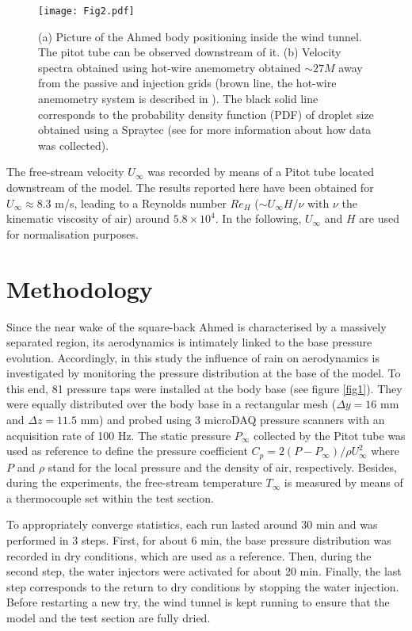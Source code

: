 \documentclass[doublecol]{epl2}
\begin{document}
\begin{figure}
\centering
\texttt{[image: Fig2.pdf]}
\caption{(a) Picture of the Ahmed body positioning inside the wind tunnel. The pitot tube can be observed downstream of it. (b) Velocity spectra obtained using hot-wire anemometry obtained $\sim27M$ away from the passive and injection grids (brown line, the hot-wire anemometry system is described in \cite{ferran2022experimental}). The black solid line corresponds to the probability density function (PDF) of droplet size obtained using a Spraytec (see \cite{sumbekova2017preferential} for more information about how data was collected).}  
\label{fig2}
\end{figure}
 
 The free-stream velocity $U_\infty$ was recorded by means of a Pitot tube located downstream of the model. The results reported here have been obtained for $U_\infty \approx 8.3$ m/s, leading to a Reynolds number $Re_H$ ($\sim U_\infty H/\nu$ with $\nu$ the kinematic viscosity of air) around $5.8 \times 10^4$. In the following, $U_\infty$ and $H$ are used for normalisation purposes.
 
\section{Methodology}

Since the near wake of the square-back Ahmed is characterised by a massively separated region, its aerodynamics is intimately linked to the base pressure evolution. Accordingly, in this study the influence of rain on aerodynamics is investigated by monitoring the pressure distribution at the base of the model. To this end, 81 pressure taps were installed at the body base (see figure \ref{fig1}). They were equally distributed over the body base  in a rectangular mesh ($\Delta y = 16$ mm and $\Delta z = 11.5$ mm) and probed using 3 microDAQ pressure scanners with an acquisition rate of 100 Hz. The static pressure $P_\infty$ collected by the Pitot tube was used as reference to define the pressure coefficient $C_p = 2\left(P-P_\infty\right)/\rho U_\infty^2$ where $P$ and $\rho$ stand for the local pressure and the density of air, respectively. Besides, during the experiments, the free-stream temperature $T_\infty$ is measured by means of a thermocouple set within the test section.

To appropriately converge statistics, each run lasted around 30 min and was performed in 3 steps. First, for about 6 min, the base pressure distribution was recorded in dry conditions, which are used as a reference. Then, during the second step, the water injectors were activated for about 20 min. Finally, the last step corresponds to the return to dry conditions by stopping the water injection. Before restarting a new try, the wind tunnel is kept running to ensure that the model and the test section are fully dried. 
\end{document}
